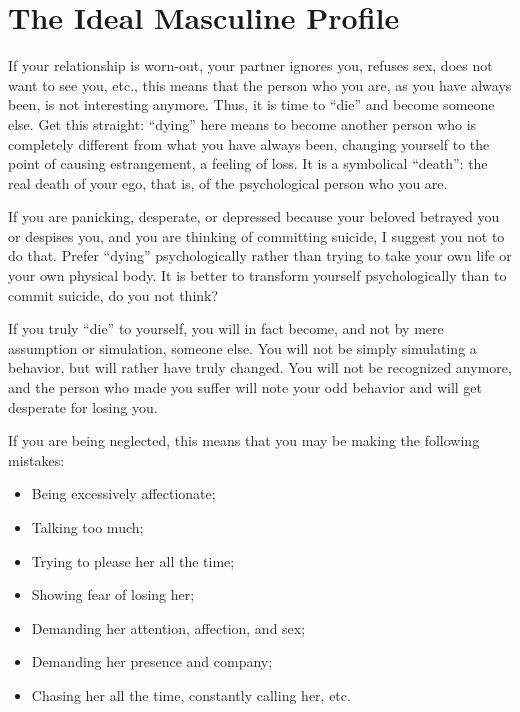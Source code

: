 \section{The Ideal Masculine Profile}

\par If your relationship is worn-out, your partner ignores you, refuses sex, does not want to see you, etc., this means that the person who you are, as you have always been, is not interesting anymore. Thus, it is time to \enquote{die} and become someone else. Get this straight: \enquote{dying} here means to become another person who is completely different from what you have always been, changing yourself to the point of causing estrangement, a feeling of loss. It is a symbolical \enquote{death}: the real death of your ego, that is, of the psychological person who you are.

\par If you are panicking, desperate, or depressed because your beloved betrayed you or despises you, and you are thinking of committing suicide, I suggest you not to do that. Prefer \enquote{dying} psychologically rather than trying to take your own life or your own physical body. It is better to transform yourself psychologically than to commit suicide, do you not think?

\par If you truly \enquote{die} to yourself, you will in fact become, and not by mere assumption or simulation, someone else. You will not be simply simulating a behavior, but will rather have truly changed. You will not be recognized anymore, and the person who made you suffer will note your odd behavior and will get desperate for losing you.

\par If you are being neglected, this means that you may be making the following mistakes:
\begin{itemize}
	\item Being excessively affectionate;
	\item Talking too much;
	\item Trying to please her all the time;
	\item Showing fear of losing her;
	\item Demanding her attention, affection, and sex;
	\item Demanding her presence and company;
	\item Chasing her all the time, constantly calling her, etc.
\end{itemize}


